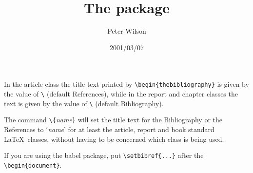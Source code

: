 \documentclass[fontsize=12pt, DIV=8, pagesize=auto]{scrartcl}
\title{The \pkg{chbibref} package}
\author{Peter Wilson}
\date{2001/03/07}
\makeatletter
\newcommand*{\pkg}[1]{\textsf{#1}}
\newcommand*{\cs}[1]{\texttt{\textbackslash#1}}
\newcommand*{\cmd}[1]{\cs{\expandafter\@gobble\string#1}}
\newcommand*{\meta}[1]{\textlangle\textsl{#1}\textrangle}
\newcommand*{\marg}[1]{\texttt{\{}\meta{#1}\texttt{\}}}
\makeatother
\begin{document}
\maketitle

In the \pkg{article} class the title text printed by 
\verb+\begin{thebibliography}+ is given by the value of \cmd{\refname}
(default \textsf{References}), while in the \pkg{report} and \pkg{chapter} 
classes the text is given by the value of \cmd{\bibname}
(default \textsf{Bibliography}).

The command \cmd{\setbibref}\marg{name} will set the title text for the 
Bibliography or the References to `\meta{name}' for at least the \pkg{article}, 
\pkg{report} and \pkg{book} standard \LaTeX\ classes, without having to be
concerned which class is being used.

If you are using the \pkg{babel} package, put \verb+\setbibref{...}+ after
the \verb+\begin{document}+.
\end{document}
